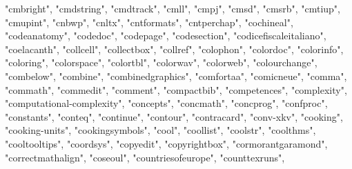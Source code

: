 \documentclass[
]{article}
\newenvironment{Shaded}{\begin{snugshade}}{\end{snugshade}}
\newcommand{\NormalTok}[1]{#1}
\newcommand{\StringTok}[1]{\textcolor[rgb]{0.31,0.60,0.02}{#1}}
\begin{document}
\begin{Shaded}
\begin{Highlighting}[]
\StringTok{"cmbright"}\NormalTok{, }\StringTok{"cmdstring"}\NormalTok{, }\StringTok{"cmdtrack"}\NormalTok{, }\StringTok{"cmll"}\NormalTok{, }\StringTok{"cmpj"}\NormalTok{, }\StringTok{"cmsd"}\NormalTok{, }
\StringTok{"cmsrb"}\NormalTok{, }\StringTok{"cmtiup"}\NormalTok{, }\StringTok{"cmupint"}\NormalTok{, }\StringTok{"cnbwp"}\NormalTok{, }\StringTok{"cnltx"}\NormalTok{, }\StringTok{"cntformats"}\NormalTok{, }
\StringTok{"cntperchap"}\NormalTok{, }\StringTok{"cochineal"}\NormalTok{, }\StringTok{"codeanatomy"}\NormalTok{, }\StringTok{"codedoc"}\NormalTok{, }\StringTok{"codepage"}\NormalTok{, }
\StringTok{"codesection"}\NormalTok{, }\StringTok{"codicefiscaleitaliano"}\NormalTok{, }\StringTok{"coelacanth"}\NormalTok{, }\StringTok{"collcell"}\NormalTok{, }
\StringTok{"collectbox"}\NormalTok{, }\StringTok{"collref"}\NormalTok{, }\StringTok{"colophon"}\NormalTok{, }\StringTok{"colordoc"}\NormalTok{, }\StringTok{"colorinfo"}\NormalTok{, }
\StringTok{"coloring"}\NormalTok{, }\StringTok{"colorspace"}\NormalTok{, }\StringTok{"colortbl"}\NormalTok{, }\StringTok{"colorwav"}\NormalTok{, }\StringTok{"colorweb"}\NormalTok{, }
\StringTok{"colourchange"}\NormalTok{, }\StringTok{"combelow"}\NormalTok{, }\StringTok{"combine"}\NormalTok{, }\StringTok{"combinedgraphics"}\NormalTok{, }\StringTok{"comfortaa"}\NormalTok{, }
\StringTok{"comicneue"}\NormalTok{, }\StringTok{"comma"}\NormalTok{, }\StringTok{"commath"}\NormalTok{, }\StringTok{"commedit"}\NormalTok{, }\StringTok{"comment"}\NormalTok{, }\StringTok{"compactbib"}\NormalTok{, }
\StringTok{"competences"}\NormalTok{, }\StringTok{"complexity"}\NormalTok{, }\StringTok{"computational{-}complexity"}\NormalTok{, }\StringTok{"concepts"}\NormalTok{, }
\StringTok{"concmath"}\NormalTok{, }\StringTok{"concprog"}\NormalTok{, }\StringTok{"confproc"}\NormalTok{, }\StringTok{"constants"}\NormalTok{, }\StringTok{"conteq"}\NormalTok{, }\StringTok{"continue"}\NormalTok{, }
\StringTok{"contour"}\NormalTok{, }\StringTok{"contracard"}\NormalTok{, }\StringTok{"conv{-}xkv"}\NormalTok{, }\StringTok{"cooking"}\NormalTok{, }\StringTok{"cooking{-}units"}\NormalTok{, }
\StringTok{"cookingsymbols"}\NormalTok{, }\StringTok{"cool"}\NormalTok{, }\StringTok{"coollist"}\NormalTok{, }\StringTok{"coolstr"}\NormalTok{, }\StringTok{"coolthms"}\NormalTok{, }
\StringTok{"cooltooltips"}\NormalTok{, }\StringTok{"coordsys"}\NormalTok{, }\StringTok{"copyedit"}\NormalTok{, }\StringTok{"copyrightbox"}\NormalTok{, }\StringTok{"cormorantgaramond"}\NormalTok{, }
\StringTok{"correctmathalign"}\NormalTok{, }\StringTok{"coseoul"}\NormalTok{, }\StringTok{"countriesofeurope"}\NormalTok{, }\StringTok{"counttexruns"}\NormalTok{, }

\end{Highlighting}
\end{Shaded}
\end{document}
